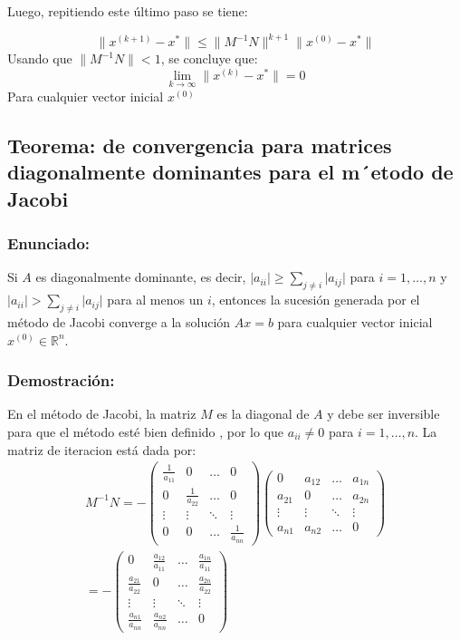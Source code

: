 \documentclass[a4paper,12pt]{article}
\begin{document}
Luego, repitiendo este último paso se tiene:

\[
\parallel x^{(k+1)}-x^*\parallel \leq \parallel M^{-1}N\parallel^{k+1} \parallel x^{(0)}-x^*\parallel
\]
Usando que $\parallel M^{-1}N\parallel<1$, se concluye que:
\[
\lim_{k \to \infty} \parallel x^{(k)}-x^*\parallel = 0
\]
Para cualquier vector inicial $x^{(0)}$

\subsection{Teorema: de convergencia para matrices diagonalmente dominantes para el m´etodo de
Jacobi}
\subsubsection{Enunciado:}
Si $A$ es diagonalmente dominante, es decir, $\lvert a_{ii}\rvert \geq \sum_{j\neq i} \lvert a_{ij}\rvert$ para $i=1,\dots ,n$ y $\lvert a_{ii}\rvert > \sum_{j\neq i} \lvert a_{ij}\rvert$ para al menos un $i$, entonces la sucesión generada por el método de Jacobi converge a la solución $Ax=b$ para cualquier vector inicial $x^{(0)} \in \mathbb{R}^n$.

\subsubsection{Demostración:}
En el método de Jacobi, la matriz $M$ es la diagonal de $A$ y debe ser inversible para que el método esté bien definido , por lo que $a_{ii}\neq 0$ para $i=1,\dots ,n$. La matriz de iteracion está dada por:
\begin{align*}
    M^{-1}N = - \begin{pmatrix}
        \frac{1}{a_{11}} & 0 & \dots & 0 \\
        0 & \frac{1}{a_{22}} & \dots & 0 \\
        \vdots & \vdots & \ddots & \vdots \\
        0 & 0 & \dots & \frac{1}{a_{nn}}
    \end{pmatrix}
    \begin{pmatrix}
        0 & a_{12} & \dots & a_{1n} \\
        a_{21} & 0 & \dots & a_{2n} \\
        \vdots & \vdots & \ddots & \vdots \\
        a_{n1} & a_{n2} & \dots & 0
    \end{pmatrix}\\
    = - \begin{pmatrix}
        0 & \frac{a_{12}}{a_{11}} & \dots & \frac{a_{1n}}{a_{11}} \\
        \frac{a_{21}}{a_{22}} & 0 & \dots & \frac{a_{2n}}{a_{22}} \\
        \vdots & \vdots & \ddots & \vdots \\
        \frac{a_{n1}}{a_{nn}} & \frac{a_{n2}}{a_{nn}} & \dots & 0
    \end{pmatrix}
\end{align*}
\end{document}
